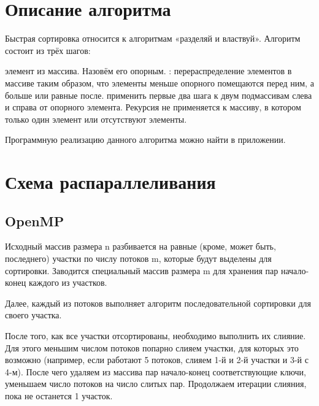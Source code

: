 \documentclass{report}
\begin{document}
\newpage

\section*{Описание алгоритма}
Быстрая сортировка относится к алгоритмам «разделяй и властвуй». Алгоритм состоит из трёх шагов:

\begin{enumerate} 

 элемент из массива. Назовём его опорным.
: перераспределение элементов в массиве таким образом, что элементы меньше опорного помещаются перед ним, а больше или равные после.
 применить первые два шага к двум подмассивам слева и справа от опорного элемента. Рекурсия не применяется к массиву, в котором только один элемент или отсутствуют элементы.

\end{enumerate} 

Программную реализацию данного алгоритма можно найти в приложении.

\newpage

\section*{Схема распараллеливания}
\subsection*{OpenMP}
\par Исходный массив размера n разбивается на равные (кроме, может быть, последнего) участки по числу потоков m, которые будут выделены для сортировки. Заводится специальный массив размера m для хранения пар начало-конец каждого из участков. 
\par Далее, каждый из потоков выполняет алгоритм последовательной сортировки для своего участка. 
\par После того, как все участки отсортированы, необходимо выполнить их слияние. Для этого меньшим числом потоков попарно слияем участки, для которых это возможно (например, если работают 5 потоков, слияем 1-й и 2-й участки и 3-й с 4-м). После чего удаляем из массива пар начало-конец соответствующие ключи, уменьшаем число потоков на число слитых пар. Продолжаем итерации слияния, пока не останется 1 участок. 
\end{document}
